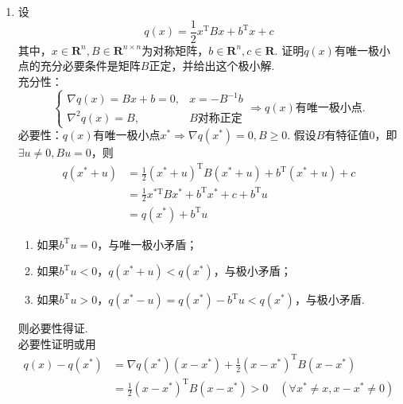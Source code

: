 \begin{enumerate}
\begin{enumerate}[label=(\arabic*)]
\[\begin{cases}
\begin{array}{cc}
\begin{matrix}
                \end{matrix}
            \end{array}\right) \geqslant 0,
        \end{cases} \Rightarrow -d_1^{(4)}-2d_2^{(4)} \geqslant 0, d_2^{(4)} \geqslant 0, d^{(4)} \neq 0.\]
        \item $\nabla f(x)^{\mathrm{T}} = (-1,2)$，$x^{(1)}$存在可行下降方向，所以从$x^{(2)},x^{(3)},x^{(4)}$中寻找最优解，由于$\displaystyle f(x^{(2)})=1,f(x^{(3)})=-\frac{1}{2},f(x^{(4)})=-2$，所以最优解为$x^{(4)}=(2,0)^{\mathrm{T}}$.
    \end{enumerate}
    \item 设\[q(x)=\frac{1}{2}x^{\mathrm{T}}Bx+b^{\mathrm{T}}x+c\]其中，$x\in\textbf{R}^n,B \in \textbf{R}^{n \times n}$为对称矩阵，$b \in \textbf{R}^n,c \in \textbf{R}$. 证明$q(x)$有唯一极小点的充分必要条件是矩阵$B$正定，并给出这个极小解.\\
    \pro 充分性：
    \[\begin{cases}
        \nabla q(x)=Bx+b=0, & x=-B^{-1}b\\
        \nabla^2 q(x)=B, & B\text{对称正定}
    \end{cases} \Rightarrow q(x)\text{有唯一极小点}.\]
    必要性：$q(x)$有唯一极小点$x^* \Rightarrow \nabla q(x^*)=0,B \geqslant 0$. 假设$B$有特征值0，即$\exists u \neq 0,Bu=0$，则
    \begin{align*}
        q(x^*+u) & = \frac{1}{2}(x^*+u)^{\mathrm{T}}B(x^*+u)+b^{\mathrm{T}}(x^*+u)+c\\
        &=\frac{1}{2}x^{*\mathrm{T}}Bx^*+b^{\mathrm{T}}x^*+c+b^{\mathrm{T}}u\\
        &=q(x^*)+b^{\mathrm{T}}u
    \end{align*}
    \begin{enumerate}[label=(\arabic*)]
        \item 如果$b^{\mathrm{T}}u=0$，与唯一极小矛盾；
        \item 如果$b^{\mathrm{T}}u<0$，$q(x^*+u)<q(x^*)$，与极小矛盾；
        \item 如果$b^{\mathrm{T}}u>0$，$q(x^*-u)=q(x^*)-b^{\mathrm{T}}u<q(x^*)$，与极小矛盾.
    \end{enumerate}
    则必要性得证.\\
    必要性证明或用
    \begin{align*}
        q(x)-q(x^*) & = \nabla q(x^*)(x-x^*)+\frac{1}{2}(x-x^*)^{\mathrm{T}}B(x-x^*)\\
        &=\frac{1}{2}(x-x^*)^{\mathrm{T}}B(x-x^*)>0 \quad (\forall x^* \neq x,x-x^* \neq 0)

\end{align*}
\end{enumerate}
